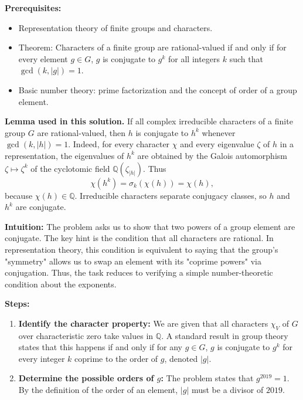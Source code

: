 \begin{solution}
\textbf{Prerequisites:}
\begin{itemize}
    \item Representation theory of finite groups and characters.
    \item Theorem: Characters of a finite group are rational-valued if and only if for every element $g \in G$, $g$ is conjugate to $g^k$ for all integers $k$ such that $\gcd(k, |g|) = 1$.
    \item Basic number theory: prime factorization and the concept of order of a group element.
\end{itemize}

\textbf{Lemma used in this solution.}
If all complex irreducible characters of a finite group $G$ are rational-valued, then $h$ is conjugate to $h^k$ whenever $\gcd(k,|h|)=1$.
Indeed, for every character $\chi$ and every eigenvalue $\zeta$ of $h$ in a representation, the eigenvalues of $h^k$ are obtained by the Galois automorphism $\zeta\mapsto \zeta^k$ of the cyclotomic field $\mathbb{Q}(\zeta_{|h|})$. Thus
\[
\chi(h^k)=\sigma_k(\chi(h))=\chi(h),
\]
because $\chi(h)\in\mathbb{Q}$. Irreducible characters separate conjugacy classes, so $h$ and $h^k$ are conjugate.

\textbf{Intuition:}
The problem asks us to show that two powers of a group element are conjugate. The key hint is the condition that all characters are rational. In representation theory, this condition is equivalent to saying that the group's "symmetry" allows us to swap an element with its "coprime powers" via conjugation. Thus, the task reduces to verifying a simple number-theoretic condition about the exponents.

\par

\textbf{Steps:}
\begin{enumerate}
    \item \textbf{Identify the character property:} We are given that all characters $\chi_V$ of $G$ over characteristic zero take values in $\mathbb{Q}$. A standard result in group theory states that this happens if and only if for any $g \in G$, $g$ is conjugate to $g^k$ for every integer $k$ coprime to the order of $g$, denoted $|g|$.

    \item \textbf{Determine the possible orders of $g$:} The problem states that $g^{2019} = 1$. By the definition of the order of an element, $|g|$ must be a divisor of $2019$.


\end{enumerate}
\end{solution}
